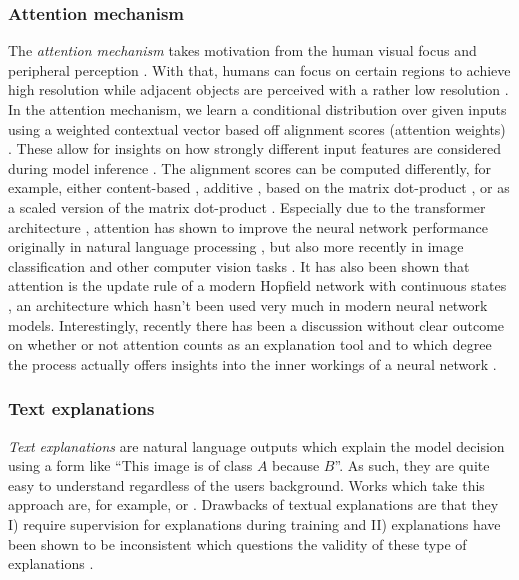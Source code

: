 \subsubsection{Attention mechanism}
The \emph{attention mechanism} \citep{VaswaniSPUJGKP17} takes motivation from the human visual focus and peripheral
perception \citep{schmidt2019recurrent}. With that, humans can focus on certain regions to achieve high resolution while adjacent objects are perceived with a rather low resolution \citep{schmidt2019recurrent}. In the attention mechanism, we learn a conditional distribution over given inputs using a weighted contextual vector based off alignment scores (attention weights) \citep{xie2020explainable}. These allow for insights on how strongly different input features are considered during model inference \citep{xie2020explainable}. The alignment scores can be computed differently, for example, either content-based \citep{graves2014neural}, additive \citep{BahdanauCB14}, based on the matrix dot-product \citep{LuongPM15}, or as a scaled version of the matrix dot-product \citep{VaswaniSPUJGKP17}. Especially due to the transformer architecture \citep{VaswaniSPUJGKP17}, attention has shown to improve the neural network performance originally in natural language processing \citep{DevlinCLT19, brown2020language, lan2019albert}, but also more recently in image classification and other computer vision tasks \citep{AnwarB19, ZamirAKHK0020}. It has also been shown that attention is the update rule of a modern Hopfield network with continuous states \citep{ramsauer2020hopfield}, an architecture which hasn't been used very much in modern neural network models. Interestingly, recently there has been a discussion without clear outcome on whether or not attention counts as an explanation tool and to which degree the process actually offers insights into the inner workings of a neural network \citep{JainW19, WiegreffeP19, SenHYKR20}.

\subsubsection{Text explanations}
\emph{Text explanations} are natural language outputs which explain the model decision using a form like ``This image is of class $A$ because $B$''. As such, they are quite easy to understand regardless of the users background. Works which take this approach are, for example, \citet{HendricksARDSD16} or \citet{ParkHARSDR18}. Drawbacks of textual explanations are that they I) require supervision for explanations during training and II) explanations have been shown to be inconsistent which questions the validity of these type of explanations \citep{CamburuSMLB20}. 

